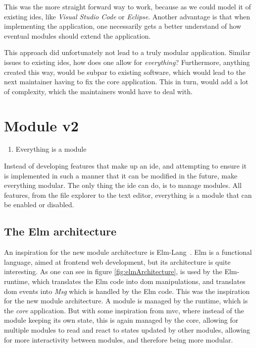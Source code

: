 This was the more straight forward way to work, because as we could model it of
existing \gls*{ide}s, like \textit{Visual Studio Code} or \textit{Eclipse}.
Another advantage is that when implementing the application, one necessarily
gets a better understand of how eventual modules should extend the application.

This approach did unfortunately not lead to a truly modular application. Similar
issues to existing \gls*{ide}s, how does one allow for \textit{everything}?
Furthermore, anything created this way, would be subpar to existing software,
which would lead to the next maintainer having to fix the core application. This
in turn, would add a lot of complexity, which the maintainers would have to deal with.

\section{Module v2} \label{sec:mod2}

\begin{enumerate}
  \item Everything is a module
\end{enumerate}

Instead of developing features that make up an \gls*{ide}, and attempting to
ensure it is implemented in such a manner that it can be modified in the future,
make everything modular. The only thing the \gls*{ide} can do, is to manage
modules. All features, from the file explorer to the text editor, everything is
a module that can be enabled or disabled.

\subsection{The Elm architecture}

An inspiration for the new module architecture is Elm-Lang~\cite{elmLang}. Elm
is a functional language, aimed at frontend web development, but its
architecture is quite interesting. As one can see in figure
\ref{fig:elmArchitecture}, is used by the Elm-runtime, which translates the Elm
code into \gls*{dom} manipulations, and translates \gls*{dom} events into
\textit{Msg} which is handled by the Elm code. This was the inspiration for the
new module architecture. A module is managed by the runtime, which is the
\textit{core} application. But with some inspiration from \gls*{mvc}, where
instead of the module keeping its own state, this is again managed by the core,
allowing for multiple modules to read and react to states updated by other
modules, allowing for more interactivity between modules, and therefore being
more modular.

